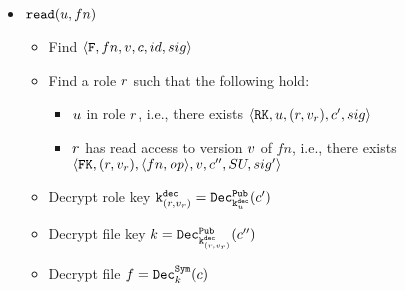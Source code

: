 {\begin{itemize}
        \item \( \mathtt{read}(u, fn) \)
        \begin{itemize}
            \item Find \( \langle \mathtt{F}, \allowbreak fn, \allowbreak v, \allowbreak c, \allowbreak id, \allowbreak sig \rangle \)
            \item Find a role \( r \) such that the following hold:
            \begin{itemize}
                \item \( u \) in role \( r \), i.e., there exists \( \langle \mathtt{RK}, \allowbreak u, \allowbreak (r, v_{r}), \allowbreak c', \allowbreak sig \rangle \)
                \item \( r \) has read access to version \( v \) of \( fn \), i.e., there exists \( \langle \mathtt{FK}, \allowbreak (r, v_{r}), \allowbreak \langle fn, \allowbreak \mathit{op} \rangle, \allowbreak v, \allowbreak c'', \allowbreak SU, \allowbreak sig' \rangle \)
            \end{itemize}
            \item Decrypt role key \( \mathtt{k}^{\mathtt{dec}}_{(r, v_{r})} = \mathtt{Dec}^{\mathtt{Pub}}_{\mathtt{k}^{\mathtt{dec}}_{u}}(c') \)
            \item Decrypt file key \( k = \mathtt{Dec}^{\mathtt{Pub}}_{\mathtt{k}^{\mathtt{dec}}_{(r, v_{r})}}(c'') \)
            \item Decrypt file \( f = \mathtt{Dec}^{\mathtt{Sym}}_{k}(c) \)
        \end{itemize}
        

\end{itemize}}
